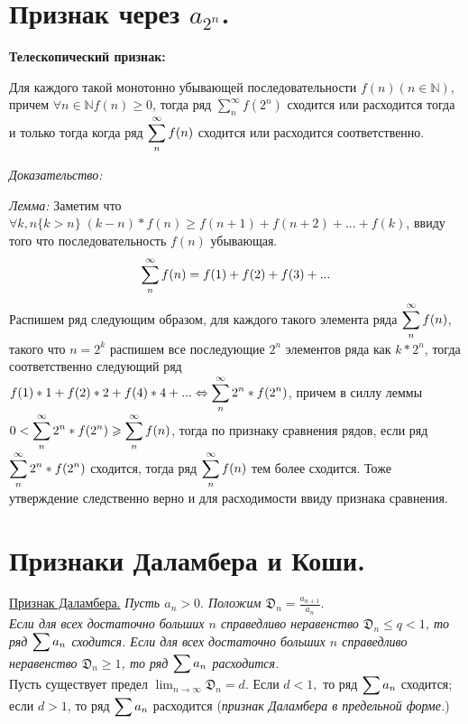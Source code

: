 \section{Признак через $a_{2^n}$.}

\textbf{Телескопический признак:}
 
Для каждого такой монотонно убывающей последовательности $f(n)(n \in \mathbb{N})$, причем $\forall n \in \mathbb{N} f(n)\geqslant 0 $, тогда ряд $\sum_{n}^{\infty} f(2^n)$ сходится или расходится тогда и только тогда когда ряд $\displaystyle\sum\limits_{n}^{\infty} f(n)$ сходится или расходится соответственно.

\textit{Доказательство:}

\textit{Лемма:}
Заметим что $\forall k,n \{k>n\} \; (k-n)*f(n)\geqslant f(n+1)+f(n+2)+...+f(k)$, ввиду того что последовательность $f(n)$ убывающая.\\
\begin{align*}
\displaystyle\sum\limits_{n}^{\infty} f(n)=f(1)+f(2)+f(3)+...
\end{align*}
Распишем ряд следующим образом, для каждого такого элемента ряда $\displaystyle\sum\limits_{n}^{\infty} f(n)$, такого что $n=2^{k}$ распишем все последующие $2^{n}$ элементов ряда как $k*2^{n}$, тогда соответственно следующий ряд $f(1)*1+f(2)*2+f(4)*4+... \Leftrightarrow \displaystyle\sum\limits_{n}^{\infty} 2^n*f(2^n)$, причем в силлу леммы  $0<\displaystyle\sum\limits_{n}^{\infty} 2^n*f(2^n)\geqslant \displaystyle\sum\limits_{n}^{\infty} f(n) $, тогда по признаку сравнения рядов, если ряд $\displaystyle\sum\limits_{n}^{\infty} 2^n*f(2^n)$ сходится, тогда ряд $\displaystyle\sum\limits_{n}^{\infty} f(n)$ тем более сходится. Тоже утверждение следственно верно и для расходимости ввиду признака сравнения.

\section{Признаки Даламбера и Коши.}

\underline{Признак Даламбера.}
\textit{Пусть $a_n > 0.$ Положим $\mathfrak{D}_n=\frac{a_{n+1}}{a_n}.$}\\
\textit{Если для всех достаточно больших $n$ справедливо неравенство $\mathfrak{D}_n \leq q < 1$, то ряд $\displaystyle\sum\limits a_n$ сходится. Если для всех достаточно больших $n$ справедливо неравенство $\mathfrak{D}_n \geq 1$, то ряд $\displaystyle\sum\limits a_n$ расходится.}\\
Пусть существует предел $\lim_{n \rightarrow \infty} \mathfrak{D}_n = d$. Если $d < 1,$ то ряд $\displaystyle\sum\limits a_n$ сходится; если $d > 1$, то ряд $\displaystyle\sum\limits a_n$ расходится (\textit{признак Даламбера в предельной форме.})\\

